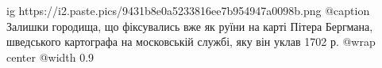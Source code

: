  
 
 
 
 

\ifcmt
  ig https://i2.paste.pics/9431b8e0a5233816ee7b954947a0098b.png
	@caption Залишки городища, що фіксувались вже як руїни на карті Пітера Бергмана, шведського картографа на московській службі, яку він уклав 1702 р.
  @wrap center
  @width 0.9
\fi
